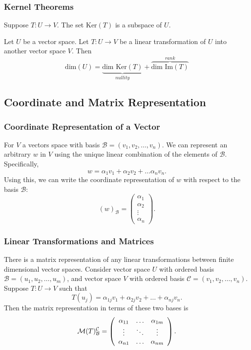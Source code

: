 \documentclass{beamer}
\begin{document}
\begin{frame}
\frametitle{Kernel Theorems}
\begin{Theorem}
Suppose $T: U\to V$. The set $\text{Ker}(T)$ is a subspace of $U$.
\end{Theorem}

\begin{Theorem}
Let $U$ be a vector space. Let $T: U\to V$ be a linear transformation of $U$ into another vector space $V$. Then
$$
\text{dim}(U) = \underbrace{\text{dim\ Ker}(T)}_{nullity} + \overbrace{\text{dim\ Im}(T)}^{rank}
$$
\end{Theorem}

\end{frame}

\subsection{Coordinate and Matrix Representation} 

\begin{frame}
\frametitle{Coordinate Representation of a Vector}
For $V$ a vectors space with basis $\mathcal{B} = (v_1, v_2,\ldots, v_n)$. We can represent an arbitrary $w$ in $V$ using the unique linear combination of the elements of $\mathcal{B}$. Specifically, 
$$
w = \alpha_1 v_1 + \alpha_2 v_2 +\ldots \alpha_n v_n.
$$
Using this, we can write the coordinate representation of $w$ with respect to the basis $\mathcal{B}$:
$$
(w)_\mathcal{B} = \left(\begin{array}{c} \alpha_1\\ \alpha_2\\\vdots\\ \alpha_n\end{array}\right).
$$
\end{frame}

\begin{frame}
\frametitle{Linear Transformations and Matrices}
There is a matrix representation of any linear transformations between finite dimensional vector spaces. Consider vector space $U$ with ordered basis $\mathcal{B} = (u_1, u_2,\ldots, u_m)$, and vector space $V$ with ordered basis $\mathcal{C} = (v_1, v_2,\ldots, v_n)$. Suppose $T: U\to V$ such that
$$
T(u_j) = \alpha_{1 j} v_1 + \alpha_{2 j} v_2 + \ldots + \alpha_{nj} v_n.
$$
Then the matrix representation in terms of these two bases is
$$
\mathcal{M}(T)_{\mathcal{B}}^{\mathcal{C}} = \left(\begin{array}{c c c c} \alpha_{11}	&	\ldots	&	\alpha_{1m}\\
												
													\vdots	& \ddots	&	\vdots\\
												\alpha_{n1}	&	\ldots	&	\alpha_{nm}\end{array}\right).
$$
\end{frame}
\end{document}
